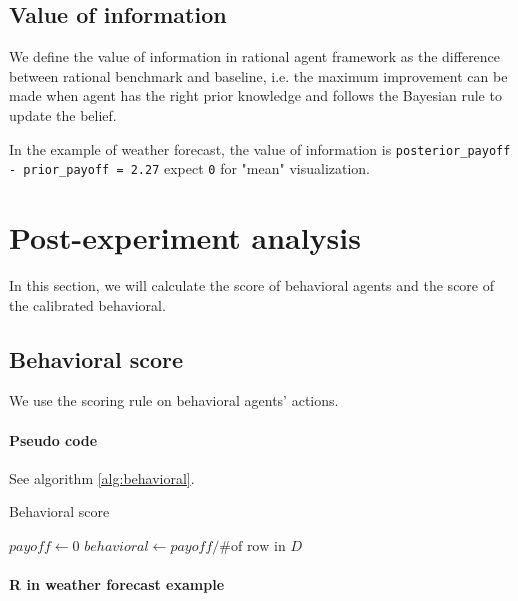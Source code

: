 \documentclass{article}
\begin{document}
\subsection{Value of information}

We define the value of information in rational agent framework as the difference between rational benchmark and baseline, i.e. the maximum improvement can be made when agent has the right prior knowledge and follows the Bayesian rule to update the belief.

In the example of weather forecast, the value of information is \texttt{posterior\_payoff - prior\_payoff = 2.27} expect \texttt{0} for "mean" visualization.



\section{Post-experiment analysis}

In this section, we will calculate the score of behavioral agents and the score of the calibrated behavioral. 

\subsection{Behavioral score}

We use the scoring rule on behavioral agents' actions.

\paragraph{Pseudo code}
See algorithm \ref{alg:behavioral}.

\begin{algorithm}[!h]
\caption{Behavioral score}\label{alg:behavioral}
$payoff \gets 0$\;
$behavioral \gets payoff / \text{\# of row in }D$\;
\end{algorithm}

\paragraph{R in weather forecast example}
\end{document}
